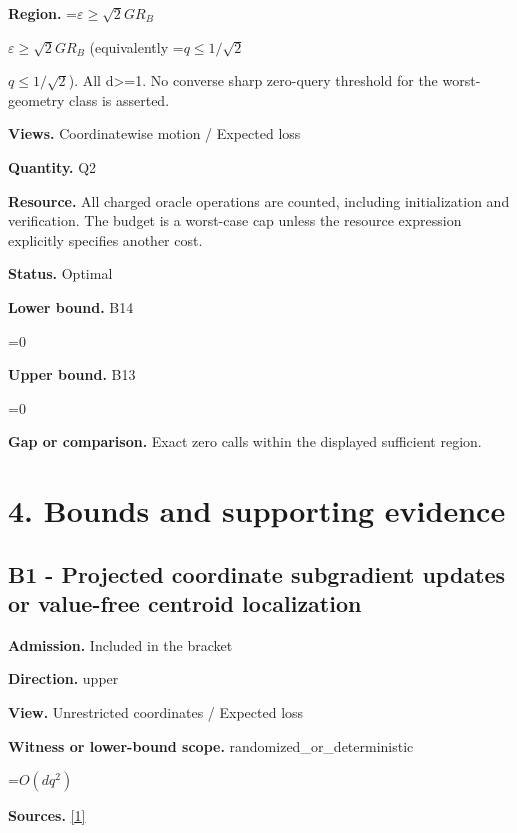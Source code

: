 \documentclass[10pt,a4paper]{article}
\newcommand{\AtlasMath}[1]{\par\begingroup\centering\setbox0=\hbox{$\displaystyle #1$}\ifdim\wd0>1.4\linewidth\typeout{ATLAS WIDE FORMULA: \the\wd0}\fi\ifdim\wd0>\linewidth\resizebox{\linewidth}{!}{\box0}\else\box0\fi\par\endgroup}
\newcommand{\AtlasInlineMath}[1]{\begingroup\setbox0=\hbox{$#1$}\ifdim\wd0>.4\linewidth\endgroup\AtlasMath{#1}\else\endgroup$#1$\fi}
\begin{document}
\textbf{Region.} \AtlasInlineMath{\varepsilon\ge\sqrt2GR_B} (equivalently \AtlasInlineMath{q\le1/\sqrt2}). All d>=1. No converse sharp zero-query threshold for the worst-geometry class is asserted.



\textbf{Views.} Coordinatewise motion / Expected loss



\textbf{Quantity.} Q2



\textbf{Resource.} All charged oracle operations are counted, including initialization and verification. The budget is a worst-case cap unless the resource expression explicitly specifies another cost.



\textbf{Status.} Optimal



\textbf{Lower bound.} B14



\AtlasMath{0}


\textbf{Upper bound.} B13



\AtlasMath{0}


\textbf{Gap or comparison.} Exact zero calls within the displayed sufficient region.



\section{4. Bounds and supporting evidence}


\subsection{B1 - Projected coordinate subgradient updates or value-free centroid localization}


\textbf{Admission.} Included in the bracket



\textbf{Direction.} upper



\textbf{View.} Unrestricted coordinates / Expected loss



\textbf{Witness or lower-bound scope.} randomized\_or\_deterministic



\AtlasMath{O(dq^2)}


\textbf{Sources.} \href{https://github.com/WU-Wendao/Colombo/blob/main/colombo_sensorium/Complexity_altas/data/sources/colombo/U03/manuscript.pdf}{[1]}
\end{document}
